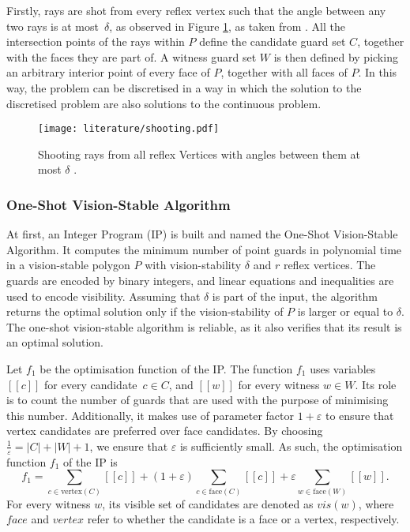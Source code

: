 Firstly, rays are shot from every reflex vertex such that the angle between any two rays is at most~$\delta$, as observed in Figure \ref{fig:rays}, as taken from \cite{DBLP:journals/corr/abs-2007-06920}. All the intersection points of the rays within $P$ define the candidate guard set $C$, together with the faces they are part of. A witness guard set $W$ is then defined by picking an arbitrary interior point of every face of $P$, together with all faces of $P$. In this way, the problem can be discretised in a way in which the solution to the discretised problem are also solutions to the continuous problem.

\begin{figure}[h!]
    \centering
    \texttt{[image: literature/shooting.pdf]}
    \caption{Shooting rays from all reflex Vertices with angles between them at most $\delta$ \cite{DBLP:journals/corr/abs-2007-06920}.}
    \label{fig:rays}
\end{figure}

\newpage
\subsubsection{One-Shot Vision-Stable Algorithm}
At first, an Integer Program (IP) is built and named the One-Shot Vision-Stable Algorithm. It computes the minimum number of point guards in polynomial time in a vision-stable polygon $P$ with  vision-stability $\delta$ and $r$ reflex vertices. The guards are encoded by binary integers, and linear equations and inequalities are used to encode visibility. Assuming that $\delta$ is part of the input, the algorithm returns the optimal solution only if the vision-stability of $P$ is larger or equal to $\delta$. The one-shot vision-stable algorithm is reliable, as it also verifies that its result is an optimal solution. 

Let $f_1$ be the optimisation function of the IP. The function $f_1$ uses variables $[[c]]$ for every candidate~$c \in C$, and $[[w]]$ for every witness $w \in W$. Its role is to count the number of guards that are used with the purpose of minimising this number. Additionally, it makes use of parameter factor $1 + \varepsilon$  to ensure that vertex candidates are preferred over face candidates. By choosing $\frac 1 \varepsilon = |C| + |W| + 1$, we ensure that $\varepsilon$ is sufficiently small. As such, the optimisation function $f_1$ of the IP is 
$$f_1 = \sum_{c \in \text{vertex}(C)} [[c]] + (1 + \varepsilon)\sum_{c \in \text{face}(C)} [[c]] + \varepsilon \sum_{w \in \text{face}(W)} [[w]].$$
For every witness $w$, its visible set of candidates are denoted as $vis(w)$, where $face$ and $vertex$ refer to whether the candidate is a face or a vertex, respectively.

